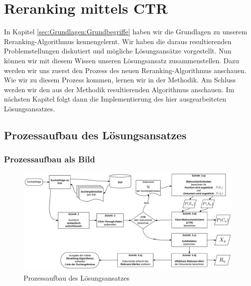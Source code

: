%
\chapter{Reranking mittels CTR}
\label{sec:Reranking}

In Kapitel \ref{sec:Grundlagen:Grundbegriffe} haben wir die Grundlagen zu unserem Reranking-Algorithmus kennengelernt. Wir haben die daraus resultierenden Problemstellungen diskutiert und mögliche Lösungsansätze vorgestellt. Nun können wir mit diesem Wissen unseren Lösungsansatz zusammenstellen. Dazu werden wir uns zuerst den Prozess des neuen Reranking-Algorithmus anschauen. Wie wir zu diesem Prozess kommen, lernen wir in der Methodik. Am Schluss werden wir den aus der Methodik resultierenden Algorithmus anschauen. Im nächsten Kapitel folgt dann die Implementierung des hier ausgearbeiteten Lösungsansatzes.


\section{Prozessaufbau des Lösungsansatzes}
\label{sec:Reranking:Prozessaufbau}

\subsection{Prozessaufbau als Bild}
\label{sec:Reranking:Prozessaufbau:ProzessaufbauBild}

\begin{figure}[H]
\centering
\vspace{-1em}
\caption[Prozessaufbau des Lösungsansatzes]{Prozessaufbau des Lösungsansatzes}
\label{fig:Prozessaufbau}
\includegraphics[width=\linewidth]{gfx/ProzessaufbauBild}
\vspace{-2em}
\end{figure}
		

